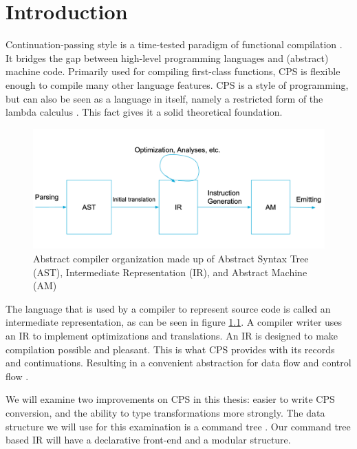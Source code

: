 
\chapter{\label{chap:introduction}Introduction}

Continuation-passing style is a time-tested paradigm of functional compilation \autocite{steele1978rabbit, DBLP:books/daglib/0022396}. It bridges the gap between high-level programming languages and (abstract) machine code. Primarily used for compiling first-class functions, CPS is flexible enough to compile many other language features. CPS is a style of programming, but can also be seen as a language in itself, namely a restricted form of the lambda calculus \autocite{barendregt1984lambda}. This fact gives it a solid theoretical foundation.

\begin{figure}
\includegraphics[width=1\textwidth]{./img/compiler_organisation.png}
\caption{Abstract compiler organization made up of Abstract Syntax Tree (AST), Intermediate Representation (IR), and Abstract Machine (AM)}
\label{fig:comporg}
\end{figure}

The language that is used by a compiler to represent source code is called an intermediate representation, as can be seen in figure \ref{fig:comporg}. A compiler writer uses an IR to implement optimizations and translations. An IR is designed to make compilation possible and pleasant. This is what CPS provides with its records and continuations. Resulting in a convenient abstraction for data flow and control flow \autocite{bruin2020framevm}. 

We will examine two improvements on CPS in this thesis: easier to write CPS conversion, and the ability to type transformations more strongly. The data structure we will use for this examination is a command tree \autocite{commandtreespoulsen}. Our command tree based IR will have a declarative front-end and a modular structure.

